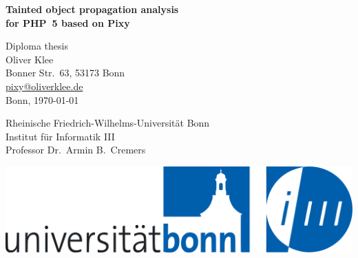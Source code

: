\begin{titlepage}

\begin{center}
\huge\textbf{\textsf{\textcolor{blue_cs3}{Tainted object propagation analysis\\for PHP~5 based on Pixy}}\normalsize}
\end{center}

\vfill

\begin{center}
  \textsf{
    Diploma thesis\\
    \vspace{1em}
    Oliver Klee\\
    Bonner Str.~63, 53173 Bonn\\
    \url{pixy@oliverklee.de}\\
    \vspace{1em}
    Bonn, \today
  }
\end{center}

\vfill

\begin{minipage}{8cm}
  \textsf{Rheinische Friedrich-Wilhelms-Universität Bonn\\Institut für Informatik III\\Professor Dr.~Armin B.~Cremers}
\end{minipage}
\begin{minipage}{8cm}
\includegraphics[scale=.12]{images/logo_ubo_i3_rgb}{}
\end{minipage}

\end{titlepage}
